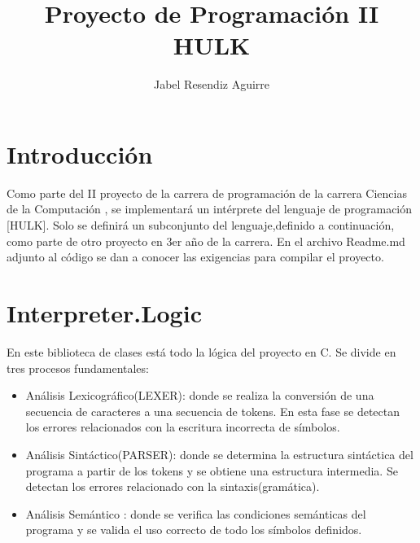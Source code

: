\documentclass[a4paper,12pt]{article}
\begin{document}
\title{Proyecto de Programaci\'on II HULK}
\author{Jabel Resendiz Aguirre}
\maketitle

\section{Introducci\'on}
    Como parte del II proyecto de la carrera de programación de la carrera Ciencias
de la Computación , se implementará un intérprete del lenguaje de programación [HULK].
Solo se definirá un subconjunto del lenguaje,definido a continuación, como parte de otro proyecto en 3er año de la carrera.
En el archivo Readme.md adjunto al código se dan a conocer las exigencias para compilar el proyecto. 


\section{Interpreter.Logic}\label{sec:intro}
 
En este biblioteca de clases está todo la lógica del proyecto en C. Se divide en tres procesos fundamentales:

\begin{itemize}
    \item An\'alisis Lexicogr\'afico(LEXER): donde se realiza la conversi\'on de una secuencia de caracteres a una secuencia de tokens. En esta fase se detectan los errores relacionados con la escritura incorrecta de s\'imbolos.
    \item An\'alisis Sint\'actico(PARSER): donde se determina la estructura sint\'actica del programa a partir de los tokens y se obtiene una estructura intermedia. Se detectan los errores relacionado con la sintaxis(gram\'atica).
    \item An\'alisis Sem\'antico : donde se verifica las condiciones sem\'anticas del programa y se valida el uso correcto de todo los s\'imbolos definidos.
\end{itemize}
\end{document}

